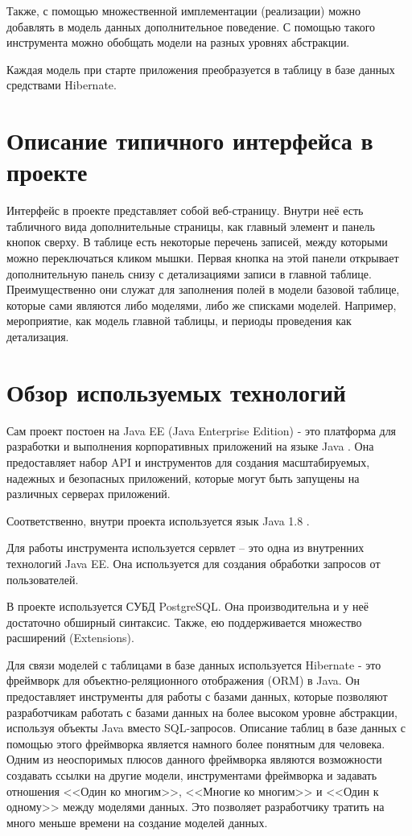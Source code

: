 \documentclass[a4paper,12pt]{diplom}
\begin{document}
Также, с помощью множественной имплементации (реализации) можно добавлять в модель данных дополнительное поведение. С помощью такого инструмента можно обобщать модели на разных уровнях абстракции.

Каждая модель при старте приложения преобразуется в таблицу в базе данных средствами Hibernate.

\section{Описание типичного интерфейса в проекте}

Интерфейс в проекте представляет собой веб-страницу. Внутри неё есть табличного вида дополнительные страницы, как главный элемент и панель кнопок сверху. В таблице есть некоторые перечень записей, между которыми можно переключаться кликом мышки. Первая кнопка на этой панели открывает дополнительную панель снизу с детализациями записи в главной таблице. Преимущественно они служат для заполнения полей в модели базовой таблице, которые сами являются либо моделями, либо же списками моделей. Например, мероприятие, как модель главной таблицы, и периоды проведения как детализация.

\section{Обзор используемых технологий}

Сам проект постоен на Java EE (Java Enterprise Edition) - это платформа для разработки и выполнения корпоративных приложений на языке Java \cite{Argun:2014}. Она предоставляет набор API и инструментов для создания масштабируемых, надежных и безопасных приложений, которые могут быть запущены на различных серверах приложений.

Соответственно, внутри проекта используется язык Java 1.8 \cite{Shildt:2018}.

Для работы инструмента используется сервлет -- это одна из внутренних технологий Java EE. Она используется для создания обработки запросов от пользователей.

В проекте используется СУБД PostgreSQL. Она производительна и у неё достаточно обширный синтаксис. Также, ею поддерживается множество расширений (Extensions).

Для связи моделей с таблицами в базе данных используется Hibernate - это фреймворк для объектно-реляционного отображения (ORM) в Java. Он предоставляет инструменты для работы с базами данных, которые позволяют разработчикам работать с базами данных на более высоком уровне абстракции, используя объекты Java вместо SQL-запросов. Описание таблиц в базе данных с помощью этого фреймворка является намного более понятным для человека. Одним из неоспоримых плюсов данного фреймворка являются возможности создавать ссылки на другие модели, инструментами фреймворка и задавать отношения <<Один ко многим>>, <<Многие ко многим>> и <<Один к одному>> между моделями данных. Это позволяет разработчику тратить на много меньше времени на создание моделей данных.
\end{document}
